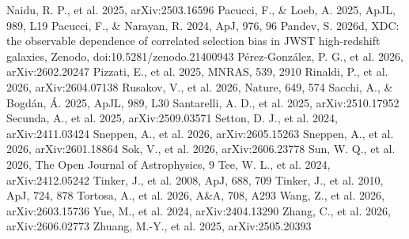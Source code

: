 \documentclass[twocolumn]{aastex631}
\begin{document}
\begin{thebibliography}{}
 Naidu, R. P., et al. 2025,
arXiv:2503.16596
 Pacucci, F., \& Loeb,
A. 2025, ApJL, 989, L19
 Pacucci, F., \&
Narayan, R. 2024, ApJ, 976, 96
 Pandev, S. 2026d, XDC: the
observable dependence of correlated selection bias in JWST
high-redshift galaxies, Zenodo, doi:10.5281/zenodo.21400943
P\'erez-Gonz\'alez, P. G., et al. 2026, arXiv:2602.20247
 Pizzati, E., et al. 2025,
MNRAS, 539, 2910
 Rinaldi, P., et al. 2026,
arXiv:2604.07138
 Rusakov, V., et al. 2026,
Nature, 649, 574
 Sacchi, A., \& Bogd\'an,
\'A. 2025, ApJL, 989, L30
 Santarelli, A. D., et
al. 2025, arXiv:2510.17952
 Secunda, A., et al. 2025,
arXiv:2509.03571
 Setton, D. J., et al. 2024,
arXiv:2411.03424
 Sneppen, A., et al. 2026,
arXiv:2605.15263
 Sneppen, A., et al. 2026,
arXiv:2601.18864
 Sok, V., et al. 2026, arXiv:2606.23778
 Sun, W. Q., et al. 2026, The Open
Journal of Astrophysics, 9
 Tee, W. L., et al. 2024,
arXiv:2412.05242
 Tinker, J., et al. 2008, ApJ,
688, 709
 Tinker, J., et al. 2010, ApJ,
724, 878
 Tortosa, A., et al. 2026,
A\&A, 708, A293
 Wang, Z., et al. 2026,
arXiv:2603.15736
 Yue, M., et al. 2024, arXiv:2404.13290
 Zhang, C., et al. 2026,
arXiv:2606.02773
 Zhuang, M.-Y., et al. 2025,
arXiv:2505.20393
\end{thebibliography}
\end{document}
